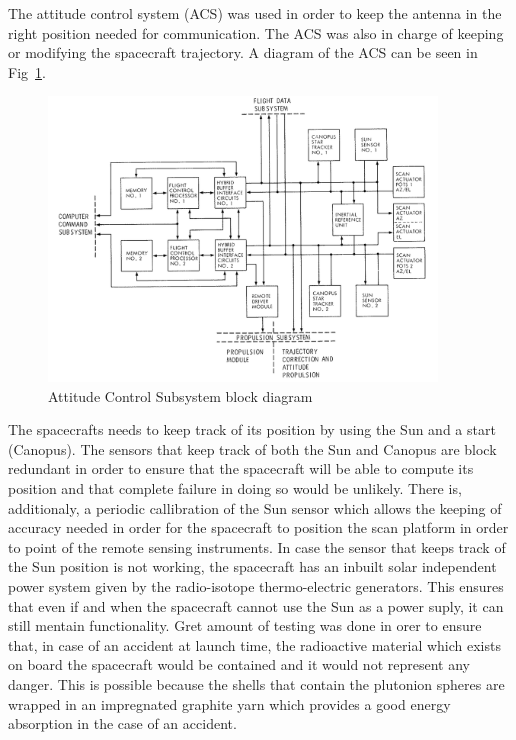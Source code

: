 The attitude control system (ACS) was used in order to keep
the antenna in the right position needed for communication. The ACS was also
in charge of keeping or modifying the spacecraft trajectory. A diagram of the
ACS can be seen in Fig~\ref{fig:voyager_bd}.

\begin{figure}[htb]
	\begin{center}
	\includegraphics[width=0.92\textwidth]{img/voyagerACS.png}
	\caption{Attitude Control Subsystem block diagram\cite{tvs}}
	\label{fig:voyager_bd}
	\end{center}
\end{figure}

The spacecrafts needs to keep track of its position by using the Sun and a start
(Canopus). The sensors that keep track of both the Sun and Canopus are block
redundant in order to ensure that the spacecraft will be able to compute its
position and that complete failure in doing so would be unlikely. There is,
additionaly, a periodic callibration of the Sun sensor which allows the keeping
of accuracy needed in order for the spacecraft to position the scan platform in
order to point of the remote sensing instruments. In case the sensor that keeps
track of the Sun position is not working, the spacecraft has an inbuilt solar
independent power system given by the radio-isotope thermo-electric generators.
This ensures that even if and when the spacecraft cannot use the Sun as a power
suply, it can still mentain functionality. Gret amount of testing was done in
orer to ensure that, in case of an accident at launch time, the radioactive
material which exists on board the spacecraft would be contained and it would
not represent any danger. This is possible because the shells that contain the
plutonion spheres are wrapped in an impregnated graphite yarn which provides a
good energy absorption in the case of an accident.


